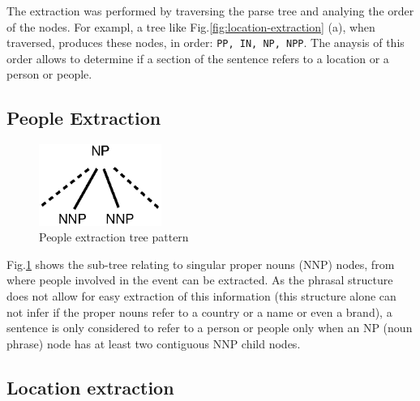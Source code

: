 \documentclass{llncs}
\begin{document}
The extraction was performed by traversing the parse tree and analying the order of the nodes. For exampl, a tree like Fig.\ref{fig:location-extraction} (a), when traversed, produces these nodes, in order: \verb!PP, IN, NP, NPP!. The anaysis of this order allows to determine if a section of the sentence refers to a location or a person or people.

\subsection{People Extraction}
\label{subsec:approach:people-extraction}

\begin{figure}[h!]
	\centering
	\includegraphics[width=40mm]{dia/people.eps}
	\caption{People extraction tree pattern}
	\label{fig:people-extraction}
\end{figure}

Fig.\ref{fig:people-extraction} shows the sub-tree relating to singular proper nouns (NNP) nodes, from where people involved in the event can be extracted. As the phrasal structure does not allow for easy extraction of this information (this structure alone can not infer if the proper nouns refer to a country or a name or even a brand), a sentence is only considered to refer to a person or people only when an NP (noun phrase) node has at least two contiguous NNP child nodes.

\subsection{Location extraction}
\label{subsec:approach:location-extraction}
\end{document}
